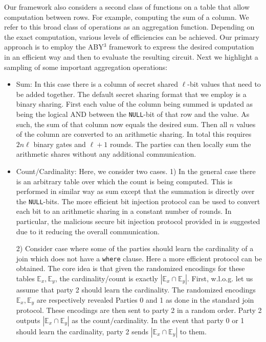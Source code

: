 Our framework also considers a second class of functions on a table that allow computation between rows. For example, computing the sum of a column. We refer to this broad class of operations as an aggregation function. Depending on the exact computation, various levels of efficiencies can be achieved. Our primary approach is to employ the ABY$^3$ framework \cite{aby3} to express the desired computation in an efficient way and then to evaluate the resulting circuit. Next we highlight a sampling of some important aggregation operations:
\begin{itemize}
	\item Sum: In this case there is a column of secret shared $\ell$-bit values that need to be added together.  The default secret sharing format that we employ is a binary sharing. First each value of the column being summed is updated as being the logical AND between the \texttt{NULL}-bit of that row and the value. As such, the sum of that column now equals the desired sum. Then all $n$ values of the column are converted to an arithmetic sharing. In total this requires $2n\ell$ binary gates and  $\ell+1$ rounds\cite{aby3}. The parties can then locally sum the arithmetic shares without any additional communication. %
	
	\item Count/Cardinality: Here, we consider two cases. 1) In the general case there is an arbitrary table over which the count is being computed. This is performed in similar way as sum except that the summation is directly over the \texttt{NULL}-bits. 
	\iffullversion 
	The more efficient bit injection protocol\cite{aby3} can be used to convert each bit to an arithmetic sharing in a constant number of rounds. In particular, the malicious secure bit injection protocol provided in \cite{aby3} is suggested due to it reducing the overall communication. 
	\fi
	
	2) Consider case where some of the parties should learn the cardinality of a join which does not have a \texttt{where} clause. Here a more efficient protocol can be obtained. The core idea is that given the randomized encodings for these tables $\mathbb{E}_x,\mathbb{E}_y$, the cardinality/count is exactly $|\mathbb{E}_x \cap \mathbb{E}_y|$. First, w.l.o.g. let us assume that party 2 should learn the cardinality. The randomized encodings $\mathbb{E}_x,\mathbb{E}_y$ are respectively revealed Parties 0 and 1  as done in the standard join protocol. These encodings are then sent to party 2 in a random order. Party 2 outputs $|\mathbb{E}_x \cap \mathbb{E}_y|$ as the count/cardinality. In the event that party 0 or 1 should learn the cardinality, party 2 sends $|\mathbb{E}_x \cap \mathbb{E}_y|$ to them. 
	

\end{itemize}
